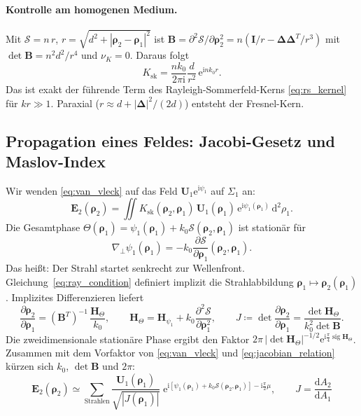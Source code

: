 \documentclass[11pt,a4paper]{scrartcl}
\theoremstyle{insightstyle}
\newcommand{\dd}{\mathrm{d}}
\newcommand{\ii}{\mathrm{i}}
\newcommand{\ee}{\mathrm{e}}
\newcommand{\grad}{\nabla_{\!\perp}}
\newcommand{\Hess}{\bm{H}}
\newcommand{\rh}{\bm{\rho}}
\newcommand{\Sc}{\mathcal{S}}
\DeclareMathOperator{\sig}{sig}
\begin{document}
\paragraph{Kontrolle am homogenen Medium.} Mit $\Sc=n\,r$, $r=\sqrt{d^2+|\rh_2-\rh_1|^2}$ ist $\bm B = \partial^2\Sc/\partial\rh_2^2 = n(\bm I/r-\bm\Delta\bm\Delta^T/r^3)$ mit $\det\bm B = n^2d^2/r^4$ und $\nu_K=0$. Daraus folgt
\begin{equation}
    K_\text{sk} = \frac{nk_0}{2\pi\ii}\frac{d}{r^2}\,\ee^{\ii nk_0r}.
\end{equation}
Das ist exakt der führende Term des Rayleigh-Sommerfeld-Kerns \eqref{eq:rs_kernel} für $kr\gg1$. Paraxial ($r\approx d+|\bm\Delta|^2/(2d)$) entsteht der Fresnel-Kern.

\subsection{Propagation eines Feldes: Jacobi-Gesetz und Maslov-Index}\label{sec:jacobi}
Wir wenden \eqref{eq:van_vleck} auf das Feld $\bm U_1\ee^{\ii\psi_1}$ auf $\Sigma_1$ an:
\begin{equation}
    \bm E_2(\rh_2) = \iint K_\text{sk}(\rh_2,\rh_1)\,\bm U_1(\rh_1)\,\ee^{\ii\psi_1(\rh_1)}\,\dd^2\rho_1 .
\end{equation}
Die Gesamtphase $\Theta(\rh_1)=\psi_1(\rh_1)+k_0\Sc(\rh_2,\rh_1)$ ist stationär für
\begin{equation}
    \grad\psi_1(\rh_1) = -k_0\frac{\partial\Sc}{\partial\rh_1}(\rh_2,\rh_1).
    \label{eq:ray_condition}
\end{equation}
Das heißt: Der Strahl startet senkrecht zur Wellenfront. Gleichung~\eqref{eq:ray_condition} definiert implizit die Strahlabbildung $\rh_1\mapsto\rh_2(\rh_1)$. Implizites Differenzieren liefert
\begin{equation}
    \frac{\partial\rh_2}{\partial\rh_1} = (\bm B^T)^{-1}\,\frac{\Hess_\Theta}{k_0},
    \qquad
    \Hess_\Theta = \Hess_{\psi_1} + k_0\frac{\partial^2\Sc}{\partial\rh_1^2},
    \qquad
    J \coloneqq \det\frac{\partial\rh_2}{\partial\rh_1} = \frac{\det\Hess_\Theta}{k_0^2\det\bm B}.
    \label{eq:jacobian_relation}
\end{equation}
Die zweidimensionale stationäre Phase ergibt den Faktor $2\pi\,|\det\Hess_\Theta|^{-1/2}\ee^{\ii\frac\pi4\sig\Hess_\Theta}$. Zusammen mit dem Vorfaktor von \eqref{eq:van_vleck} und \eqref{eq:jacobian_relation} kürzen sich $k_0$, $\det\bm B$ und $2\pi$:
\begin{equation}
    \boxed{\;\bm E_2(\rh_2) \simeq \sum_{\text{Strahlen}}\frac{\bm U_1(\rh_1)}{\sqrt{|J(\rh_1)|}}\;\ee^{\ii[\psi_1(\rh_1)+k_0\Sc(\rh_2,\rh_1)]-\ii\frac\pi2\mu},
    \qquad J=\frac{\dd A_2}{\dd A_1}\;}
    \label{eq:jacobian_amplitude}
\end{equation}
\end{document}
